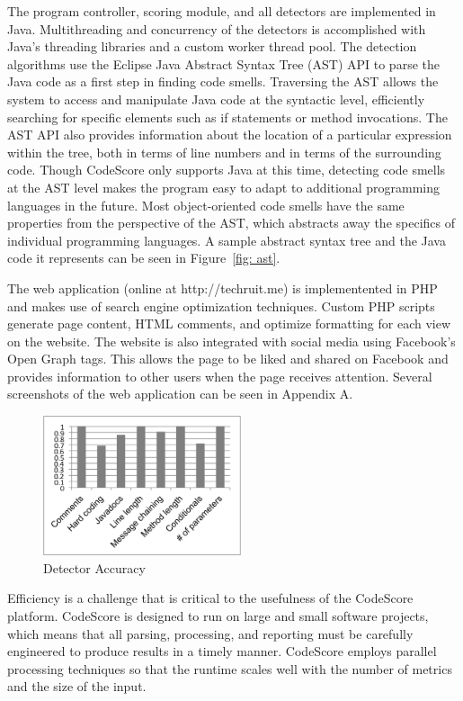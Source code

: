\documentclass{sig-alternate}
\begin{document}
The program controller, scoring module, and all detectors are implemented in
Java. Multithreading and concurrency of the detectors is accomplished with Java's threading libraries
and a custom worker thread pool. The detection algorithms use the Eclipse Java Abstract 
Syntax Tree (AST) API to parse the
Java code as a first step in finding code smells. Traversing the AST allows the
system to access and manipulate Java code at the syntactic level, efficiently searching
for specific elements such as if statements or method invocations. The AST API also
provides information about the location of a particular expression within the
tree, both in terms of line numbers and in terms of the surrounding code.  
Though CodeScore only supports Java at this time, detecting code smells at the AST level 
makes the program easy to adapt to additional programming languages in the future.
Most object-oriented code smells have the same properties from the perspective of the AST,
which abstracts away the specifics of individual programming languages. A sample
abstract syntax tree and the Java code it represents can be seen in Figure~\ref{fig: ast}.

The web application (online at http://techruit.me) is implementented in PHP and makes use of search engine
optimization techniques. Custom PHP scripts generate page content, HTML comments, and optimize
formatting for each view on the website. The website is also integrated with
social media using Facebook's Open Graph tags. This allows the page to be liked and shared on
Facebook and provides information to other users when the page receives
attention. Several screenshots of the web application can be seen in Appendix
A.

\begin{figure}[ht!]
	\begin{center}
		\includegraphics[width=220px]{accuracy}
	\end{center}
	\vspace{-12pt}
	\caption{Detector Accuracy}
	\label{fig: acc}
\end{figure}


Efficiency is a challenge that is critical to the usefulness of the CodeScore
platform. CodeScore is designed to run
on large and small software projects, which means that all parsing, processing,
and reporting must be carefully engineered to produce results in a timely
manner. CodeScore employs parallel processing techniques so that the runtime
scales well with the number of metrics and the size of the input.
\end{document}
